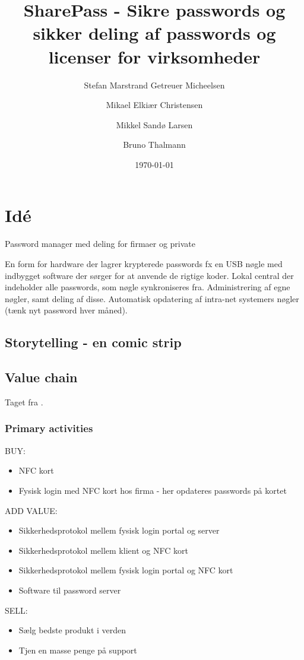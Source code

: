 \documentclass[a4paper]{article}
\title{SharePass - Sikre passwords og sikker deling af passwords og licenser for virksomheder}
\author{Stefan Marstrand Getreuer Micheelsen \and Mikael Elkiær Christensen \and Mikkel Sandø Larsen \and Bruno Thalmann}
\date{\today}
\begin{document}
\maketitle


\section{Idé}
Password manager med deling for firmaer og private

En form for hardware der lagrer krypterede passwords fx en USB nøgle med indbygget software der sørger for at anvende de rigtige koder.
Lokal central der indeholder alle passwords, som nøgle synkroniseres fra.
Administrering af egne nøgler, samt deling af disse.
Automatisk opdatering af intra-net systemers nøgler (tænk nyt password hver måned).

\subsection{Storytelling - en comic strip}

\subsection{Value chain}
Taget fra \citet[p.~12]{rose2012software}.
\subsubsection*{Primary activities}
BUY:
\begin{itemize}
\item NFC kort
\item Fysisk login med NFC kort hos firma - her opdateres passwords på kortet
\end{itemize}
ADD VALUE:
\begin{itemize}
\item Sikkerhedsprotokol mellem fysisk login portal og server
\item Sikkerhedsprotokol mellem klient og NFC kort
\item Sikkerhedsprotokol mellem fysisk login portal og NFC kort
\item Software til password server
\end{itemize}
SELL:
\begin{itemize}
\item Sælg bedste produkt i verden
\item Tjen en masse penge på support
\end{itemize}
\end{document}
